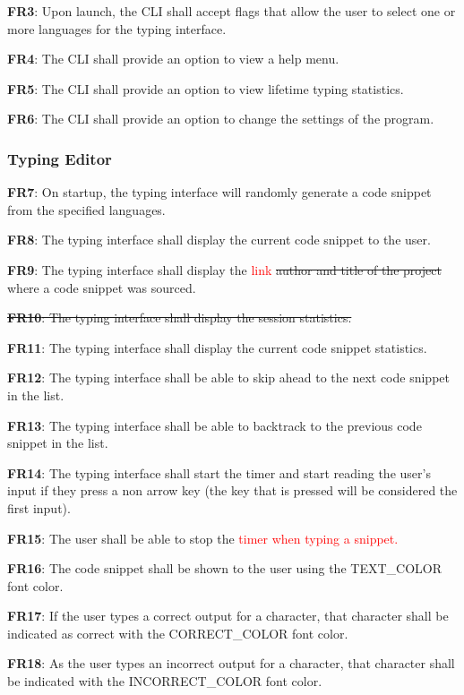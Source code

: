 \documentclass[12pt, titlepage]{article}
\begin{document}
\noindent \textbf{FR3}: Upon launch, the CLI shall accept flags that allow the user to select one or more languages for the typing interface.

\noindent \textbf{FR4}: The CLI shall provide an option to view a help menu.

\noindent \textbf{FR5}: The CLI shall provide an option to view lifetime typing statistics.

\noindent \textbf{FR6}: The CLI shall provide an option to change the settings of the program.

\subsubsection{Typing Editor}
\noindent \textbf{FR7}: On startup, the typing interface will randomly generate a code snippet from the specified languages.

\noindent \textbf{FR8}: The typing interface shall display the current code snippet to the user.

\noindent \textbf{FR9}: The typing interface shall display the \textcolor{red}{link} \sout{author and title of the project} where a code snippet was sourced.

\noindent \sout{\textbf{FR10}: The typing interface shall display the session statistics.}

\noindent \textbf{FR11}: The typing interface shall display the current code snippet statistics.

\noindent \textbf{FR12}: The typing interface shall be able to skip ahead to the next code snippet in the list.

\noindent \textbf{FR13}: The typing interface shall be able to backtrack to the previous code snippet in the list.

\noindent \textbf{FR14}: The typing interface shall start the timer and start reading the user's input if they press a non arrow key (the key that is pressed will be considered the first input).

\noindent \textbf{FR15}: The user shall be able to stop the \textcolor{red}{timer when typing a snippet.}

\noindent \textbf{FR16}: The code snippet shall be shown to the user using the TEXT\_COLOR font color.

\noindent \textbf{FR17}: If the user types a correct output for a character, that character shall be indicated as correct with the CORRECT\_COLOR font color.

\noindent \textbf{FR18}: As the user types an incorrect output for a character, that character shall be indicated with the INCORRECT\_COLOR font color.
\end{document}
